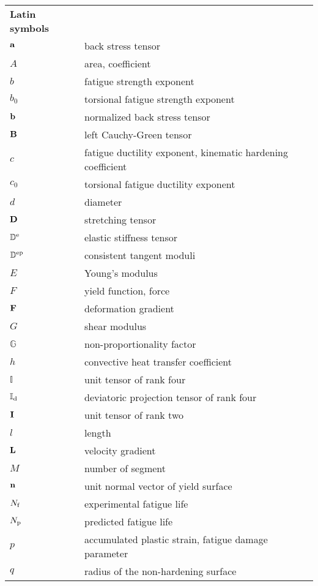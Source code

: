 \begin{table}[htb]
  \centering
    \begin{tabular}{p{3cm}p{10.5cm}}
    \textbf{Latin symbols} & \\
    $\bf{a}$ & back stress tensor \\
    $A$ & area, coefficient \\
    $b$ & fatigue strength exponent \\
    $b_0$ & torsional fatigue strength exponent \\
    $\bf{b}$ & normalized back stress tensor \\
    $\bf{B}$ & left Cauchy-Green tensor \\
    $c$ & fatigue ductility exponent, kinematic hardening coefficient \\
    $c_0$ & torsional fatigue ductility exponent \\
    $d$  & diameter \\
    $\bf{D}$ & stretching tensor \\
    $\mathbb{D}^{\rm{e}}$ & elastic stiffness tensor \\
    $\mathbb{D}^{\rm{ep}}$ & consistent tangent moduli \\
    $E$   & Young's modulus \\
    $F$   & yield function, force \\
    $\bf{F}$ & deformation gradient \\
    $G$   & shear modulus \\
    $\mathbb{G}$ & non-proportionality factor \\
    $h$ & convective heat transfer coefficient \\
    $\mathbb{I}$ & unit tensor of rank four \\
    $\mathbb{I}_{\rm{d}}$ & deviatoric projection tensor of rank four \\
    $\bf{I}$ & unit tensor of rank two \\
    $l$ & length \\
    $\bf{L}$ & velocity gradient \\
    $M$ & number of segment \\
    $\bf{n}$ & unit normal vector of yield surface \\
    $N_{\rm{f}}$ & experimental fatigue life \\
    $N_{\rm{p}}$ & predicted fatigue life \\
    $p$   & accumulated plastic strain, fatigue damage parameter \\
    $q$   & radius of the non-hardening surface \\

\end{tabular}
\end{table}
